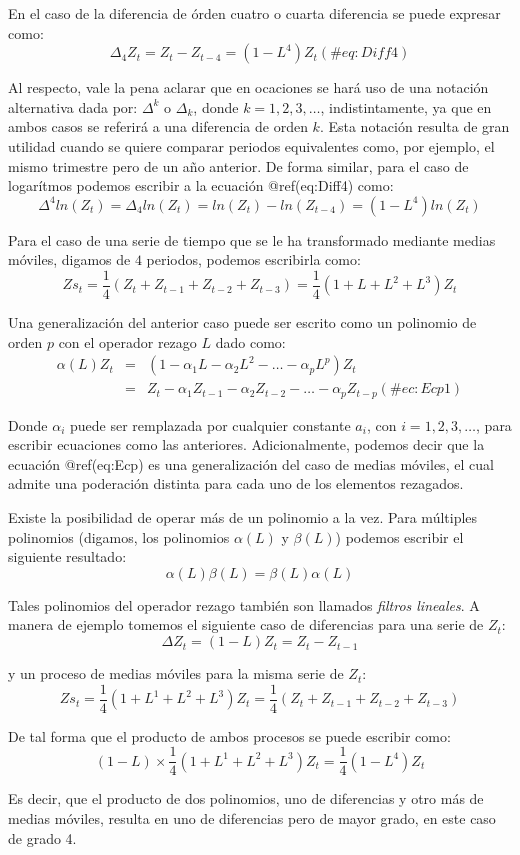 \documentclass[
  a4paper,
]{article}
\begin{document}
En el caso de la diferencia de órden cuatro o cuarta diferencia se puede
expresar como: \[
    \Delta_{4} Z_{t} = Z_{t} - Z_{t-4} = (1 - L^4) Z_{t}
(\#eq:Diff4)
\]

Al respecto, vale la pena aclarar que en ocaciones se hará uso de una
notación alternativa dada por: \(\Delta^k\) o \(\Delta_k\), donde
\(k = 1, 2, 3, \ldots\), indistintamente, ya que en ambos casos se
referirá a una diferencia de orden \(k\). Esta notación resulta de gran
utilidad cuando se quiere comparar periodos equivalentes como, por
ejemplo, el mismo trimestre pero de un año anterior. De forma similar,
para el caso de logarítmos podemos escribir a la ecuación @ref(eq:Diff4)
como: \[
    \Delta^{4} ln(Z_{t}) = \Delta_{4} ln(Z_{t}) = ln(Z_{t}) - ln(Z_{t-4}) = (1 - L^4) ln(Z_{t}) 
\]

Para el caso de una serie de tiempo que se le ha transformado mediante
medias móviles, digamos de \(4\) periodos, podemos escribirla como: \[
    Zs_{t} = \frac{1}{4}(Z_{t} + Z_{t-1} + Z_{t-2} + Z_{t-3}) = \frac{1}{4}(1 + L + L^2 + L^3)Z_{t}
\]

Una generalización del anterior caso puede ser escrito como un polinomio
de orden \(p\) con el operador rezago \(L\) dado como: \begin{eqnarray}
    \alpha(L) Z_{t} & = & (1 - \alpha_1 L - \alpha_2 L^2 - \ldots - \alpha_p L^p) Z_{t} \nonumber \\
    & = & Z_{t} - \alpha_1 Z_{t-1} - \alpha_2 Z_{t-2} - \ldots - \alpha_p Z_{t-p}
(\#ec:Ecp1)
\end{eqnarray}

Donde \(\alpha_i\) puede ser remplazada por cualquier constante \(a_i\),
con \(i = 1, 2, 3, \ldots\), para escribir ecuaciones como las
anteriores. Adicionalmente, podemos decir que la ecuación @ref(eq:Ecp)
es una generalización del caso de medias móviles, el cual admite una
poderación distinta para cada uno de los elementos rezagados.

Existe la posibilidad de operar más de un polinomio a la vez. Para
múltiples polinomios (digamos, los polinomios \(\alpha(L)\) y
\(\beta(L)\)) podemos escribir el siguiente resultado: \[
    \alpha(L) \beta(L) = \beta(L) \alpha(L)
\]

Tales polinomios del operador rezago también son llamados \emph{filtros
lineales}. A manera de ejemplo tomemos el siguiente caso de diferencias
para una serie de \(Z_t\): \[
    \Delta Z_{t} = (1 - L) Z_{t} = Z_{t} - Z_{t-1}  
\]

y un proceso de medias móviles para la misma serie de \(Z_t\): \[
    Zs_{t} = \frac{1}{4}(1 + L^1 + L^2 + L^3) Z_{t} = \frac{1}{4}(Z_{t} + Z_{t-1} + Z_{t-2} + Z_{t-3})  
\]

De tal forma que el producto de ambos procesos se puede escribir como:
\[
(1 - L) \times \frac{1}{4}(1 + L^1 + L^2 + L^3) Z_{t} = \frac{1}{4}(1 - L^4) Z_{t}
\]

Es decir, que el producto de dos polinomios, uno de diferencias y otro
más de medias móviles, resulta en uno de diferencias pero de mayor
grado, en este caso de grado 4.


\printbibliography
\end{document}
